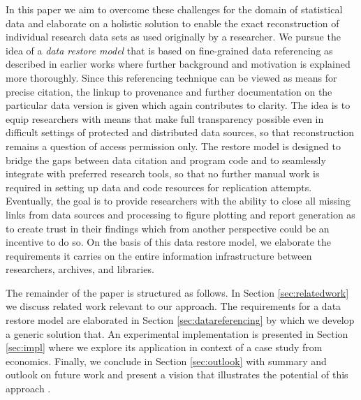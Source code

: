 \documentclass{acm_proc_article-sp}
\begin{document}
In this paper we aim to overcome these challenges for the domain of statistical data and elaborate on a holistic solution to enable the exact reconstruction of individual research data sets as used originally by a researcher.
We pursue the idea of a \emph{data restore model} that is based on fine-grained data referencing as described in earlier works \cite{BahlsTochtermann_2012}
where further background and motivation is explained more thoroughly.
Since this referencing technique can be viewed as means for precise citation, the linkup to provenance and further documentation on the particular data version is given which again contributes to clarity.
The idea is to equip researchers with means that make full transparency possible even in difficult settings of protected and distributed data sources, so that reconstruction remains a question of access permission only.
The restore model is designed to bridge the gaps between data citation and program code and to seamlessly integrate with preferred research tools, so that no further manual work is required in setting up data and code resources for replication attempts.
Eventually, the goal is to provide researchers with the ability to close all missing links from data sources and processing to figure plotting and report generation as to create trust in their findings which from another perspective could be an incentive to do so.
On the basis of this data restore model, we elaborate the requirements it carries on the entire information infrastructure between researchers, archives, and libraries.


 
The remainder of the paper is structured as follows. 
In Section \ref{sec:relatedwork} we discuss related work relevant to our approach. 
The requirements for a data restore model are elaborated in Section \ref{sec:datareferencing} by which we develop a generic solution that.
An experimental implementation is presented in Section \ref{sec:impl} where we explore its application in context of a case study from economics.
Finally, we conclude in Section \ref{sec:outlook} with summary and outlook on future work and present a vision that illustrates the potential of this approach .
\end{document}
